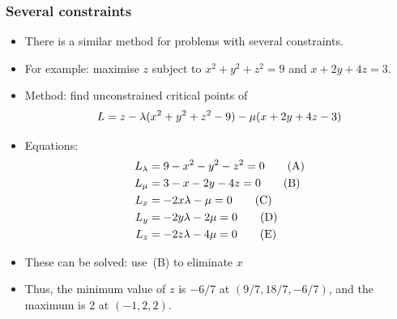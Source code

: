 \documentclass[9pt]{beamer}
\begin{document}
\begin{frame}[t]
 \frametitle{Several constraints}
 
 \begin{itemize}
  \item<1-> There is a similar method for problems with several
   constraints.
  \item<2-> For example: maximise $z$ subject to $x^2+y^2+z^2=9$ and
   $x+2y+4z=3$.
  \item<3-> Method: find unconstrained critical points of 
   \[ L=z-\lambda(x^2+y^2+z^2-9)-\mu(x+2y+4z-3) \]
  \item<4-> Equations: \vspace{-4.5ex}
   \begin{align*}
    L_\lambda &= 9-x^2-y^2-z^2=0 \tag{A} \\
    L_\mu &= 3-x-2y-4z=0 \tag{B} \\
    L_x &= -2x\lambda- \mu =0 \tag{C} \\
    L_y &= -2y\lambda-2\mu =0 \tag{D} \\
    L_z &= -2z\lambda-4\mu =0 \tag{E}
   \end{align*}
  \item<5-> These can be solved: use~(B) to eliminate $x$
  \item<11-> Thus, the minimum value of $z$ is $-6/7$ at
   $(9/7,18/7,-6/7)$, and the maximum is $2$ at $(-1,2,2)$.
 \end{itemize}
\end{frame}
\end{document}
